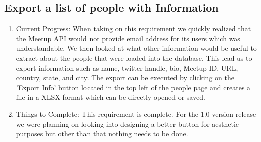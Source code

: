 \documentclass[letterpaper,10pt,onecolumn]{IEEEtran} %
\begin{document}
\subsection{Export a list of people with Information}
\begin{enumerate}[label*=\arabic*.]
  \item Current Progress: When taking on this requirement we quickly realized that
    the Meetup API would not provide email address for its users which was
    understandable. We then looked at what other information would be useful to
    extract about the people that were loaded into the database. This lead us to
    export information such as name, twitter handle, bio, Meetup ID, URL, country,
    state, and city. The export can be executed by clicking on the 'Export Info'
    button located in the top left of the people page and creates a file in a XLSX
    format which can be directly opened or saved.


  \item Things to Complete: This requirement is complete. For the 1.0 version
    release we were planning on looking into designing a better button for
    aesthetic purposes but other than that nothing needs to be done.

\end{enumerate}
\end{document}
